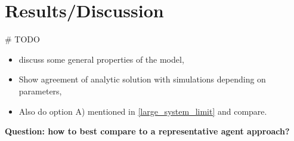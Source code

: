 \section{Results/Discussion}

\# TODO 

\begin{itemize}
	\item discuss some general properties of the model,
	\item Show agreement of analytic solution with simulations depending on parameters, \\
	\item Also do option A) mentioned in \ref{large_system_limit} and compare.
\end{itemize}

\textbf{Question: how to best compare to a representative agent approach?}
